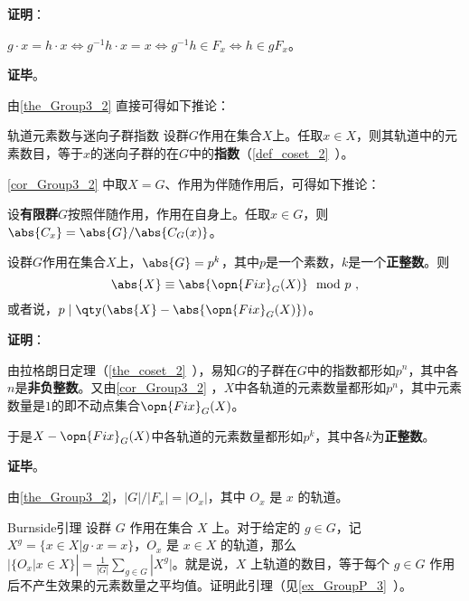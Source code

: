 \textbf{证明}：

 $g\cdot x=h\cdot x\iff g^{-1}h\cdot x=x\iff g^{-1}h\in F_x\iff h\in gF_x$。

\textbf{证毕}。






由\autoref{the_Group3_2} 直接可得如下推论：


\begin{corollary}{轨道元素数与迷向子群指数}\label{cor_Group3_2}
设群$G$作用在集合$X$上。任取$x\in X$，则其轨道中的元素数目，等于$x$的迷向子群的在$G$中的\textbf{指数}（\autoref{def_coset_2}~）。
\end{corollary}




\autoref{cor_Group3_2} 中取$X=G$、作用为伴随作用后，可得如下推论：

\begin{corollary}{}\label{cor_Group3_3}

设\textbf{有限群}$G$按照伴随作用，作用在自身上。任取$x\in G$，则$\abs{C_x}=\abs{G}/\abs{C_G(x)}$。

\end{corollary}




\begin{theorem}{}\label{the_Group3_5}
设群$G$作用在集合$X$上，$\abs{G}=p^k$，其中$p$是一个素数，$k$是一个\textbf{正整数}。则
\begin{equation}
\abs{X} \equiv \abs{\opn{Fix}_G(X)} \mod  p~,
\end{equation}
或者说，$p\mid \qty(\abs{X}-\abs{\opn{Fix}_G(X)})$。
\end{theorem}

\textbf{证明}：

由拉格朗日定理（\autoref{the_coset_2}~），易知$G$的子群在$G$中的指数都形如$p^n$，其中各$n$是\textbf{非负整数}。又由\autoref{cor_Group3_2} ，$X$中各轨道的元素数量都形如$p^n$，其中元素数量是$1$的即不动点集合$\opn{Fix}_G(X)$。

于是$X-\opn{Fix}_G(X)$中各轨道的元素数量都形如$p^k$，其中各$k$为\textbf{正整数}。

\textbf{证毕}。









\begin{corollary}{}\label{cor_Group3_1}
由\autoref{the_Group3_2}，$|G|/|F_x|=|O_x|$，其中 $O_x$ 是 $x$ 的轨道。
\end{corollary}

\begin{exercise}{Burnside引理}\label{exe_Group3_2}
设群 $G$ 作用在集合 $X$ 上。对于给定的 $g\in G$，记 $X^g=\{x\in X|g\cdot x=x\}$，$O_x$ 是 $x\in X$ 的轨道，那么 $|\{O_x|x\in X\}|=\frac{1}{|G|}\sum_{g\in G}|X^g|$。就是说，$X$ 上轨道的数目，等于每个 $g\in G$ 作用后不产生效果的元素数量之平均值。证明此引理（见\autoref{ex_GroupP_3}~）。
\end{exercise}
